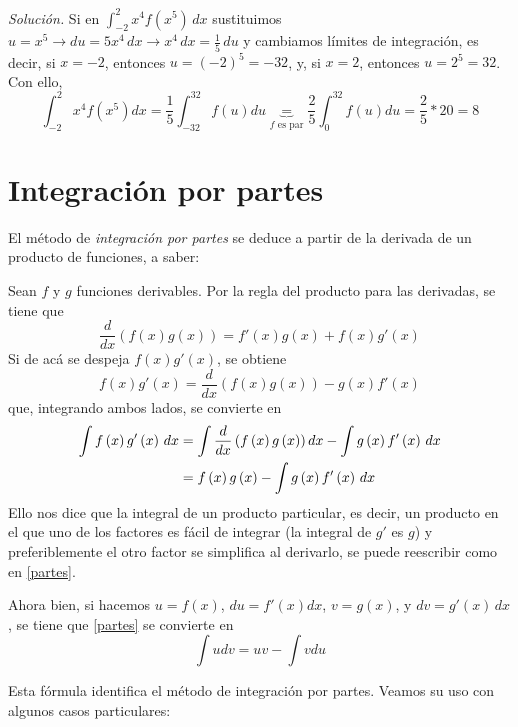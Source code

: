 \emph{Solución.} Si en $\int_{-2}^{2}x^{4}f(x^{5})\,dx$ sustituimos $u=x^{5}\rightarrow du=5x^{4}\,dx\rightarrow x^{4}\,dx=\frac{1}{5}\,du$ y cambiamos límites de integración, es decir, si $x=-2$, entonces $u=(-2)^{5}=-32$, y, si $x=2$, entonces $u=2^{5}=32$. Con ello,
\[
\int_{-2}^{2}x^{4}f\left( x^{5}\right) dx=\frac{1}{5}\int_{-32}^{32}f\left(
u\right) du\underset{f\text{ es par}}{\underbrace{=}}\frac{2}{5}%
\int_{0}^{32}f\left( u\right) du=\frac{2}{5}\ast 20=8
\]

\section{Integración por partes}

El método de \emph{integración por partes} se deduce a partir de la derivada de un producto de funciones, a saber:

\enlargethispage*{\baselineskip}

Sean $f$ y $g$ funciones derivables. Por la regla del producto para las derivadas, se tiene que
\[
\frac{d}{dx}\left( f\left( x\right) g\left( x\right) \right) =f'\left(
x\right) g\left( x\right) +f\left( x\right) g'\left( x\right)
\]
Si de acá se despeja $f\left( x\right) g'\left( x\right) $, se obtiene
\[
f\left( x\right) g'\left( x\right) =\frac{d}{dx}\left( f\left( x\right)g\left( x\right) \right) -g\left( x\right) f'\left( x\right)
\]
que, integrando ambos lados, se convierte en
\begin{align}\label{partes}
\int f\left( x\right) g'\left( x\right)\,dx&=\int \frac{d}{dx}\left(
f\left( x\right) g\left( x\right) \right) dx-\int g\left( x\right)
f'\left( x\right)\,dx\notag\\
&=f\left( x\right) g\left(
x\right) -\int g\left( x\right) f'\left( x\right)\,dx
\end{align}
Ello nos dice que la integral de un producto particular, es decir, un producto en el que uno de los factores es fácil de integrar (la integral de $g'$ es $g$) y preferiblemente el otro factor se simplifica al derivarlo, se puede reescribir como en \eqref{partes}.

Ahora bien, si hacemos $u=f\left( x\right)$, $du=f'\left( x\right)
dx$, $v=g\left( x\right)$, y $dv=g'\left( x\right)\,dx$, se tiene que \eqref{partes} se convierte en
\begin{equation}\label{partesformula}
\int udv=uv-\int vdu
\end{equation}

Esta fórmula identifica el método de integración por partes. Veamos su uso con algunos casos particulares:

